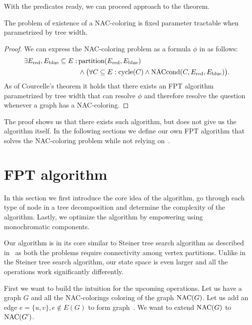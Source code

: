 With the predicates ready, we can proceed approach to the theorem.
%
\begin{theorem}
	The problem of existence of a NAC-coloring is fixed parameter
	tractable when parametrized by tree width.
\end{theorem}
%
\begin{proof}
	We can express the NAC-coloring problem
	as a formula \( \phi \) in \MSO{} as follows:
	\begin{align*}
		\exists E_{\text{red}}, E_{\text{blue}} \subseteq E : \,
		 & \text{partition}(E_{\text{red}}, E_{\text{blue}})                                                                 \\
		 & \land \big(\forall C \subseteq E : \text{cycle}(C) \land \text{NACcond}(C, E_{\text{red}}, E_{\text{blue}}) \big)
		.
	\end{align*}
	As of Courcelle's theorem 
	it holds that there exists an FPT algorithm parametrized by tree width
	that can resolve \( \phi \) and therefore resolve the question whenever a graph has a NAC-coloring.
\end{proof}
%
The proof shows us that there exists such algorithm,
but does not give us the algorithm itself.
In the following sections we define our
own FPT algorithm that solves the NAC-coloring problem
while not relying on~\MSO{}.

\section{FPT algorithm}

In this section we first introduce the core idea of the algorithm,
go through each type of node in a tree decomposition and
determine the complexity of the algorithm.
Lastly, we optimize the algorithm by empowering using monochromatic components.

Our algorithm is in its core similar to Steiner tree search algorithm
as described in~\cite{book_parametrized_algorithms} as both the problems require connectivity
among vertex partitions. Unlike in the Steiner tree search algorithm,
our state space is even larger and all the operations work significantly differently.

First we want to build the intuition for the upcoming operations.
Let us have a graph \( G \) and all the NAC-colorings coloring of the graph
\( \operatorname{NAC} (G) \). Let us add an edge \( e = \{u, v\}, e \not\in E(G) \) to form graph~\Gprime{}.
We want to extend \( \operatorname{NAC} (G) \) to \( \operatorname{NAC} (G^\prime) \).

